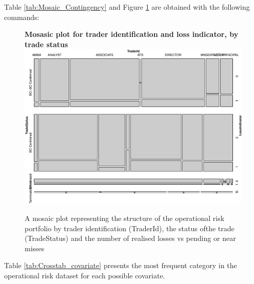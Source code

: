 \documentclass{DissertateUSU}
\begin{document}
Table \ref{tab:Mosaic_Contingency} and Figure \ref{Mosaic_Contingency}
are obtained with the following commands:

\singlespacing

\singlespacing
\begin{figure}
\centering
\textbf{Mosasic plot for trader identification and loss indicator, by trade status}
\includegraphics[width=\linewidth,height=0.75\linewidth]{Mosaic_Contingency.eps}
\caption[Portfolio structure by trader, trade status and number of realised losses]{A mosaic plot representing the structure of the operational risk portfolio by trader identification (TraderId), the status ofthe trade (TradeStatus) and the number of realised losses vs pending or near misses}
\label{Mosaic_Contingency}
\end{figure}
\doublespacing

Table \ref{tab:Crosstab_covariate} presents the most frequent category
in the operational risk dataset for each possible covariate.
\end{document}
